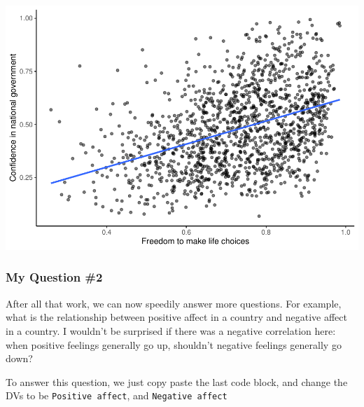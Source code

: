 \documentclass[]{book}
\newenvironment{Shaded}{\begin{snugshade}}{\end{snugshade}}
\newcommand{\KeywordTok}[1]{\textcolor[rgb]{0.13,0.29,0.53}{\textbf{#1}}}
\newcommand{\DataTypeTok}[1]{\textcolor[rgb]{0.13,0.29,0.53}{#1}}
\newcommand{\StringTok}[1]{\textcolor[rgb]{0.31,0.60,0.02}{#1}}
\newcommand{\CommentTok}[1]{\textcolor[rgb]{0.56,0.35,0.01}{\textit{#1}}}
\newcommand{\OperatorTok}[1]{\textcolor[rgb]{0.81,0.36,0.00}{\textbf{#1}}}
\newcommand{\NormalTok}[1]{#1}
\begin{document}
\includegraphics{Statistics_Lab_files/figure-latex/unnamed-chunk-74-1.pdf}

\subsubsection{My Question \#2}\label{my-question-2}

After all that work, we can now speedily answer more questions. For
example, what is the relationship between positive affect in a country
and negative affect in a country. I wouldn't be surprised if there was a
negative correlation here: when positive feelings generally go up,
shouldn't negative feelings generally go down?

To answer this question, we just copy paste the last code block, and
change the DVs to be \texttt{Positive\ affect}, and
\texttt{Negative\ affect}

\begin{Shaded}
\end{Shaded}
\end{document}
